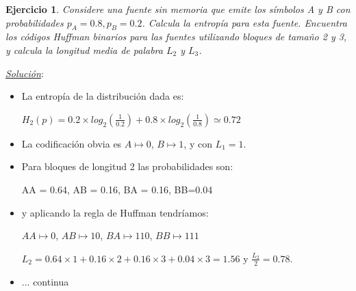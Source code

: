 \documentclass{beamer}
\theoremstyle{plain}
\theoremstyle{example}
\newtheorem{ejercicio} [Ejercicio]{Ejercicio}
\theoremstyle{example}
\begin{document}
\begin{frame}  \footnotesize 

\begin{ejercicio}

Considere una fuente sin memoria que emite los símbolos A y B con probabilidades $p_A= 0.8, p_B = 0.2$. Calcula la entropía para esta fuente.  Encuentra los códigos Huffman binarios para las fuentes utilizando bloques de tamaño 2 y 3, y calcula la longitud media de palabra $L_2$ y $L_3$.

\end{ejercicio}

\pause
\textit{\underline{Solución}}:\\

\begin{itemize}

\item La entropía de la distribución dada es: 

$H_2(p)= 0.2 \times log_2(\frac{1}{0.2}) + 0.8 \times log_2(\frac{1}{0.8}) \simeq 0.72$ 

\item La codificación obvia es $A \mapsto 0$, $B \mapsto 1$, y con $L_1 =1$.

\item Para bloques de longitud 2 las probabilidades son:

AA = 0.64, AB = 0.16, BA = 0.16, BB=0.04

\item y aplicando la regla de Huffman tendríamos:

$AA \mapsto 0$, $AB \mapsto 10$, $BA \mapsto 110$, $BB \mapsto 111$

$L_2=0.64 \times 1+ 0.16 \times 2+ 0.16 \times 3 + 0.04 \times 3 = 1.56$ y $\frac{L_2}{2}=0.78$.
\item ... continua 
\end{itemize}

\end{frame} 
\end{document}
